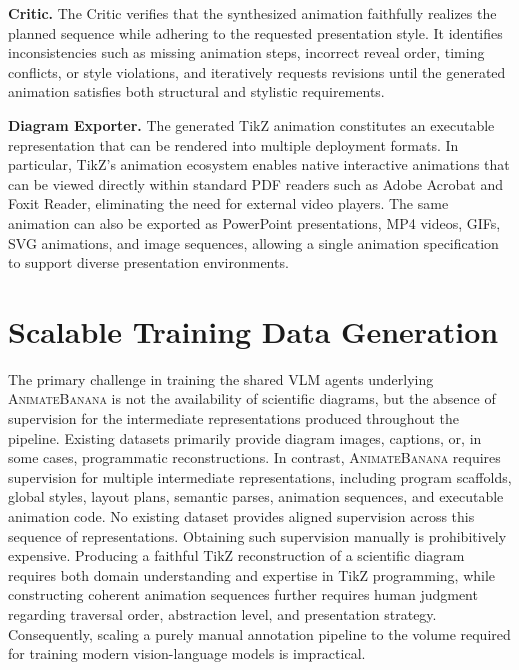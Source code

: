 \documentclass{article} %
\begin{document}
\noindent\textbf{Critic.}
The Critic verifies that the synthesized animation faithfully realizes the planned sequence while adhering to the requested presentation style. It identifies inconsistencies such as missing animation steps, incorrect reveal order, timing conflicts, or style violations, and iteratively requests revisions until the generated animation satisfies both structural and stylistic requirements.

\noindent\textbf{Diagram Exporter.}
The generated TikZ animation constitutes an executable representation that can be rendered into multiple deployment formats. In particular, TikZ's animation ecosystem enables native interactive animations that can be viewed directly within standard PDF readers such as Adobe Acrobat and Foxit Reader, eliminating the need for external video players. The same animation can also be exported as PowerPoint presentations, MP4 videos, GIFs, SVG animations, and image sequences, allowing a single animation specification to support diverse presentation environments.

\section{Scalable Training Data Generation}

The primary challenge in training the shared VLM agents underlying \textsc{AnimateBanana} is not the availability of scientific diagrams, but the absence of supervision for the intermediate representations produced throughout the pipeline. Existing datasets primarily provide diagram images, captions, or, in some cases, programmatic reconstructions. In contrast, \textsc{AnimateBanana} requires supervision for multiple intermediate representations, including program scaffolds, global styles, layout plans, semantic parses, animation sequences, and executable animation code. No existing dataset provides aligned supervision across this sequence of representations. Obtaining such supervision manually is prohibitively expensive. Producing a faithful TikZ reconstruction of a scientific diagram requires both domain understanding and expertise in TikZ programming, while constructing coherent animation sequences further requires human judgment regarding traversal order, abstraction level, and presentation strategy. Consequently, scaling a purely manual annotation pipeline to the volume required for training modern vision-language models is impractical.
\end{document}
